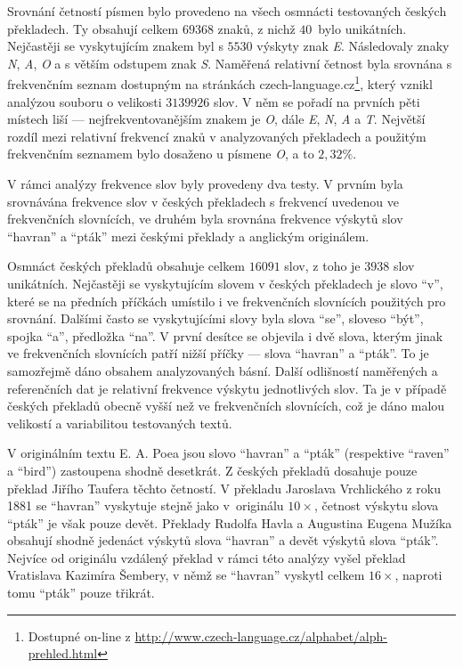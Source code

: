 \documentclass[dp.tex]{subfiles}
\begin{document}
Srovnání četností písmen bylo provedeno na všech osmnácti testovaných českých překladech. Ty obsahují celkem $69368$ znaků, z nichž $40$~bylo unikátních. Nejčastěji se vyskytujícím znakem byl s $5530$ výskyty znak \textit{E}. Následovaly znaky \textit{N}, \textit{A}, \textit{O} a s větším odstupem znak \textit{S}. Naměřená relativní četnost byla srovnána s frekvenčním seznam dostupným na stránkách czech-language.cz\footnote{Dostupné on-line z \url{http://www.czech-language.cz/alphabet/alph-prehled.html}}, který vznikl analýzou souboru o velikosti $3 139 926$ slov. V něm se pořadí na prvních pěti místech liší --- nejfrekventovanějším znakem je \textit{O}, dále \textit{E}, \textit{N}, \textit{A} a \textit{T}. Největší rozdíl mezi relativní frekvencí znaků v analyzovaných překladech a použitým frekvenčním seznamem bylo dosaženo u písmene \textit{O}, a to $2{,}32\%$.

V rámci analýzy frekvence slov byly provedeny dva testy. V prvním byla srovnávána frekvence slov v českých překladech s frekvencí uvedenou ve frekvenčních slovnících, ve druhém byla srovnána frekvence výskytů slov \enquote{havran} a \enquote{pták} mezi českými překlady a anglickým originálem. 

Osmnáct českých překladů obsahuje celkem $16091$ slov, z toho je $3938$ slov unikátních. Nejčastěji se vyskytujícím slovem v českých překladech je slovo \enquote{v}, které se na předních příčkách umístilo i ve frekvenčních slovnících použitých pro srovnání. Dalšími často se vyskytujícími slovy byla slova \enquote{se}, sloveso \enquote{být}, spojka \enquote{a}, předložka \enquote{na}. V první desítce se objevila i dvě slova, kterým jinak ve frekvenčních slovnících patří nižší příčky --- slova \enquote{havran} a \enquote{pták}. To je samozřejmě dáno obsahem analyzovaných básní. Další odlišností naměřených a referenčních dat je relativní frekvence výskytu jednotlivých slov. Ta je v případě českých překladů obecně vyšší než ve frekvenčních slovnících, což je dáno malou velikostí a variabilitou testovaných textů.

V originálním textu E. A. Poea jsou slovo \enquote{havran} a \enquote{pták} (respektive \enquote{raven} a \enquote{bird}) zastoupena shodně desetkrát. Z českých překladů dosahuje pouze překlad Jiřího Taufera těchto četností. V překladu Jaroslava Vrchlického z roku 1881 se \enquote{havran} vyskytuje stejně jako v~originálu $10\times$, četnost výskytu slova \enquote{pták} je však pouze devět. Překlady Rudolfa Havla a Augustina Eugena Mužíka obsahují shodně jedenáct výskytů slova \enquote{havran} a devět výskytů slova \enquote{pták}. Nejvíce od originálu vzdálený překlad v rámci této analýzy vyšel překlad Vratislava Kazimíra Šembery, v němž se \enquote{havran} vyskytl celkem $16\times$, naproti tomu \enquote{pták} pouze třikrát.
\end{document}
